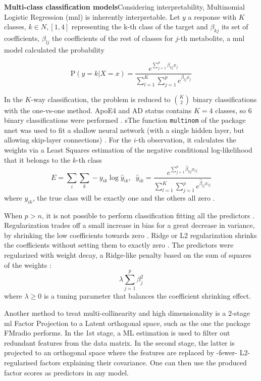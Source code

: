 \documentclass{amsart}
\begin{document}
\leavevmode\newline \textbf{Multi-class classification models}\hspace{.25cm}Considering interpretability, Multinomial Logistic Regression (\acrshort{mnl}) is inherently interpretable. Let $y$ a response with $K$ classes, $k \in N, [1,4]$ representing the k-th class of the target and $\beta_{kj}$ its set of coefficients,  $\beta_{lj}$ the coefficients of the rest of classes for $j$-th metabolite, a \acrlong{mnl} model calculated the probability

\[\textrm{P}(y=k|X=x) =  \dfrac{e^{\sum_{j=1}^{p}\beta_{kj}x_j}}{\sum_{l=1}^{K}\sum_{j=1}^{p}e^{\beta_{lj}x_j}}\]

In the $K$-way classification, the problem is reduced to $\binom{K}{2}$ binary classifications with the one-vs-one method. ApoE4 and AD status contains $K =4$ classes, so 6 binary classifications were performed \cite{James2023AnEdition}. sThe function \texttt{multinom} of the package \textsf{nnet} was used to fit a shallow neural network (with a single hidden layer, but allowing skip-layer connections) \cite{nnet}. For the $i$-th observation, it calculates the weights via a Least Squares estimation of the negative conditional log-likelihood that it belongs to the $k$-th class
\[E = \sum_{i}\sum_{k}-y_{ik}\log\hat{y}_{ik}, \; \;  \hat{y}_{ik} =  \dfrac{e^{\sum_{j=1}^{p}\hat{\beta}_{kj}x_{ij}}}{\sum_{l=1}^{K}\sum_{j=1}^{p}e^{\hat{\beta}_{lj}x_{ij}}}\]
where $y_{ik}$, the true class will be exactly one and the others all zero \cite{nnet}. 

When $p > n$, it is not possible to perform classification fitting all the predictors \cite{James2023AnEdition}. Regularization trades off a small increase in bias for a great decrease in variance, by shrinking the low coefficients towards zero \cite{James2023AnEdition}. Ridge or L2 regularization \cite{Cessie1992RidgeRegression} shrinks the coefficients without setting them to exactly zero \cite{Cessie1992RidgeRegression}. The predictors were regularized with weight decay, a Ridge-like penalty based on the sum of squares of the weights \cite{nnet}: 
\[\lambda\sum_{j=1}^{p}\beta_j^2 \]where $\lambda \geq 0$ is a tuning parameter that balances the coefficient shrinking effect.

Another method to treat multi-collinearity and high dimensionality is a 2-stage \acrfull{ml} Factor Projection to a Latent orthogonal space, such as the one the package \textsf{FMradio} \cite{Peeters2019StableData} performs. In the 1st stage, a ML estimation is used to filter out redundant features from the data matrix. In the second stage, the latter is projected to an orthogonal space where the features are replaced by -fewer- L2-regularised  factors explaining their covariance. One can then use the produced factor scores as predictors in any model.
\end{document}
